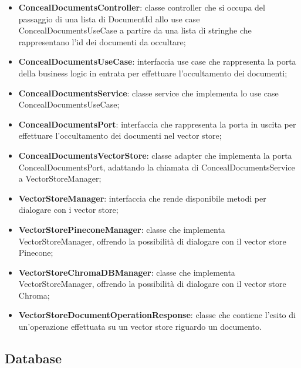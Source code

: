 \documentclass[10pt, a4paper]{article}
\begin{document}
\begin{itemize}
    \item \label{ConcealDocumentsController}\textbf{ConcealDocumentsController}: classe controller che si occupa del passaggio di una lista di DocumentId allo use case ConcealDocumentsUseCase a partire da una lista di stringhe che rappresentano l'id dei documenti da occultare;
    \item \label{ConcealDocumentsUseCase}\textbf{ConcealDocumentsUseCase}: interfaccia use case che rappresenta la porta della business logic in entrata per effettuare l'occultamento dei documenti;
    \item \label{ConcealDocumentsService}\textbf{ConcealDocumentsService}: classe service che implementa lo use case ConcealDocumentsUseCase;
    \item \label{ConcealDocumentsPort}\textbf{ConcealDocumentsPort}: interfaccia che rappresenta la porta in uscita per effettuare l'occultamento dei documenti nel vector store;
    \item \label{ConcealDocumentsVectorStore}\textbf{ConcealDocumentsVectorStore}: classe adapter che implementa la porta ConcealDocumentsPort, adattando la chiamata di ConcealDocumentsService a VectorStoreManager;
    \item \label{VectorStoreManager}\textbf{VectorStoreManager}: interfaccia che rende disponibile metodi per dialogare con i vector store;
    \item \label{VectorStorePineconeManager}\textbf{VectorStorePineconeManager}: classe che implementa VectorStoreManager, offrendo la possibilità di dialogare con il vector store Pinecone;
    \item \label{VectorStoreChromaDBManager}\textbf{VectorStoreChromaDBManager}: classe che implementa VectorStoreManager,  offrendo la possibilità di dialogare con il vector store Chroma;
    \item \label{VectorStoreDocumentOperationResponse}\textbf{VectorStoreDocumentOperationResponse}: classe che contiene l'esito di un'operazione effettuata su un vector store riguardo un documento.
\end{itemize}


\subsection{Database} %
\end{document}
